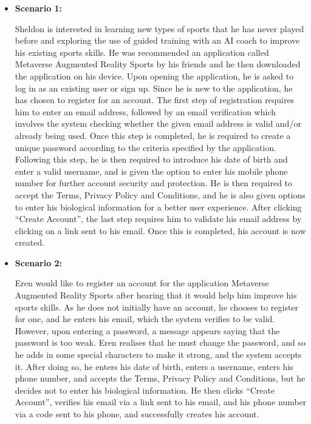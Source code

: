 \documentclass[a4paper]{article}
\begin{document}
\begin{itemize}
\begin{enumerate}[itemindent=1em]
		\end{enumerate}
		\item[] \textbf{Scenario 1:}
		\par \hspace*{1cm} Sheldon is interested in learning new types of sports that he has never played before and exploring the use of guided training with an AI coach to improve his existing sports skills. He was recommended an application called Metaverse Augmented Reality Sports by his friends and he then downloaded the application on his device. Upon opening the application, he is asked to log in as an existing user or sign up. Since he is new to the application, he has chosen to register for an account. The first step of registration requires him to enter an email address, followed by an email verification which involves the system checking whether the given email address is valid and/or already being used. Once this step is completed, he is required to create a unique password according to the criteria specified by the application. Following this step, he is then required to introduce his date of birth and enter a valid username, and is given the option to enter his mobile phone number for further account security and protection. He is then required to accept the Terms, Privacy Policy and Conditions, and he is also given options to enter his biological information for a better user experience. After clicking “Create Account”, the last step requires him to validate his email address by clicking on a link sent to his email. Once this is completed, his account is now created.
		\item[] \textbf{Scenario 2:}
		\par \hspace*{1cm} Eren would like to register an account for the application Metaverse Augmented Reality Sports after hearing that it would help him improve his sports skills. As he does not initially have an account, he chooses to register for one, and he enters his email, which the system verifies to be valid. However, upon entering a password, a message appears saying that the password is too weak. Eren realises that he must change the password, and so he adds in some special characters to make it strong, and the system accepts it. After doing so, he enters his date of birth, enters a username, enters his phone number, and accepts the Terms, Privacy Policy and Conditions, but he decides not to enter his biological information. He then clicks “Create Account”, verifies his email via a link sent to his email, and his phone number via a code sent to his phone, and successfully creates his account.
	\end{itemize}
\end{document}
